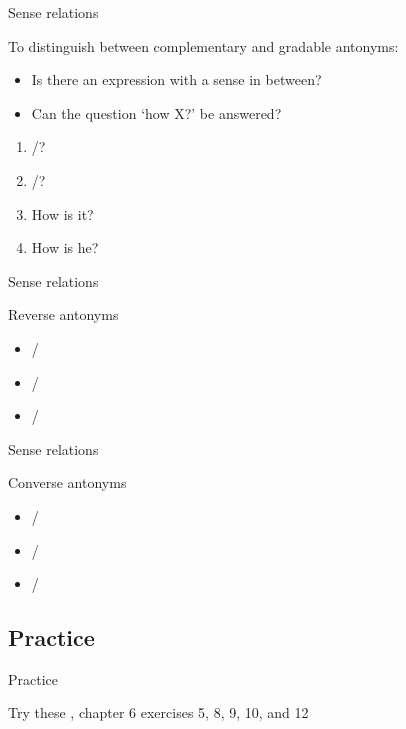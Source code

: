 \documentclass{beamer}
\newcommand{\subtwothree}{Sense relations}
\newcommand{\subtwofour}{Practice}
\begin{document}
      \begin{frame}{\subtwothree}
        \begin{block}{To distinguish between complementary and gradable antonyms:}
          \begin{itemize}
            \item Is there an expression with a sense in between?
            \item<2-> Can the question `how X?' be answered?
          \end{itemize}
        \end{block}
        \begin{example}
          \begin{enumerate}
            \item {}/?
            \item {}/?
            \item<2-> How  is it?
            \item<2-> How  is he?
          \end{enumerate}
        \end{example}
      \end{frame}

      \begin{frame}[t]{\subtwothree}
        \begin{alertblock}{Reverse antonyms}
          
        \end{alertblock}
        \begin{example}
          \begin{itemize}
            \item {}/
            \item {}/
            \item {}/
          \end{itemize}
        \end{example}
      \end{frame}

      \begin{frame}[t]{\subtwothree}
        \begin{alertblock}{Converse antonyms}
          
        \end{alertblock}
        \begin{example}
          \begin{itemize}
            \item {}/
            \item {}/
            \item {}/
          \end{itemize}
        \end{example}
      \end{frame}

    \subsection{\subtwofour}
      \begin{frame}{\subtwofour}
        \begin{block}{Try these}
          \textcite{dawson_language_2016}, chapter 6 exercises 5, 8, 9, 10, and 12
        \end{block}
      \end{frame}
\end{document}
